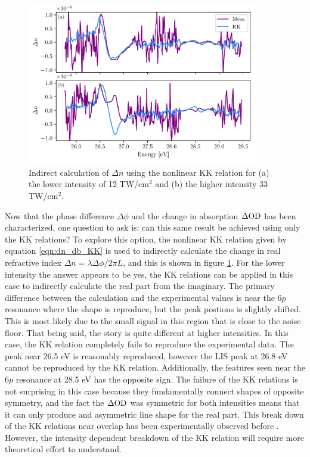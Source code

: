 \begin{figure}
	\centering
	\includegraphics[width=0.9\textwidth]{figures/CATS/dn_kk_lineout.pdf}
	\caption[Nonlinear KK relation applied to CATS measurement]{Indirect calculation of $\Delta n$ using the nonlinear KK relation for (a) the lower intensity of 12 TW/cm$^2$ and (b) the higher intensity 33 TW/cm$^2$.}
	\label{fig:dn_kk_lineout}
\end{figure}

Now that the phase difference $\Delta\phi$ and the change in absorption $\Delta\mathrm{OD}$ has been characterized, one question to ask is: can this same result be achieved using only the KK relations? To explore this option, the nonlinear KK relation given by equation \ref{eqn:dn_db_KK} is used to indirectly calculate the change in real refractive index $\Delta n = \lambda \Delta\phi/2\pi L$, and this is shown in figure \ref{fig:dn_kk_lineout}.  For the lower intensity the answer appears to be yes, the KK relations can be applied in this case to indirectly calculate the real part from the imaginary.  The primary difference between the calculation and the experimental values is near the $6p$ resonance where the shape is reproduce, but the peak postions is slightly shifted.  This is most likely due to the small signal in this region that is close to the noise floor.  That being said, the story is quite different at higher intensities.  In this case, the KK relation completely fails to reproduce the experimental data.  The peak near 26.5 eV is reasonably reproduced, however the LIS peak at 26.8 eV cannot be reproduced by the KK relation.  Additionally, the features seen near the $6p$ resonance at 28.5 eV has the opposite sign.  The failure of the KK relations is not surprising in this case because they fundamentally connect shapes of opposite symmetry, and the fact the $\Delta\mathrm{OD}$ was symmetric for both intensities means that it can only produce and asymmetric line shape for the real part.  This break down of the KK relations near overlap has been experimentally observed before \cite{tokunagaFemtosecondTimeresolvedDispersion1993}.  However, the intensity dependent breakdown of the KK relation will require more theoretical effort to understand.

